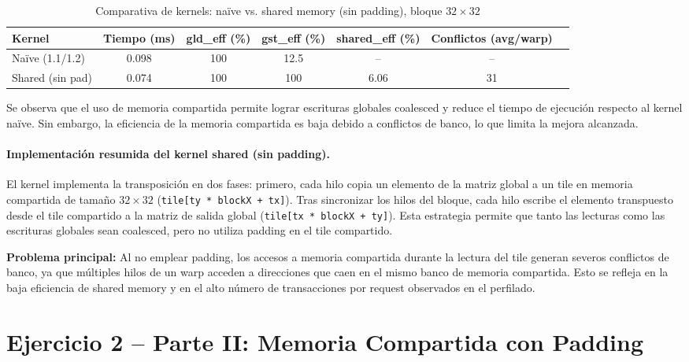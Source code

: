 \documentclass[a4paper,11pt]{article}
\begin{document}
\begin{table}[H]
\centering
\caption{Comparativa de kernels: naïve vs. shared memory (sin padding), bloque $32\times32$}
\begin{tabular}{lcccccc}
\toprule
Kernel & Tiempo (ms) & gld\_eff (\%) & gst\_eff (\%) & shared\_eff (\%) & Conflictos (avg/warp) \\
\midrule
Naïve (1.1/1.2) & 0.098 & 100 & 12.5 & -- & -- \\
Shared (sin pad) & 0.074 & 100 & 100 & 6.06 & 31 \\
\bottomrule
\end{tabular}
\end{table}

Se observa que el uso de memoria compartida permite lograr escrituras globales coalesced y reduce el tiempo de ejecución respecto al kernel naïve. Sin embargo, la eficiencia de la memoria compartida es baja debido a conflictos de banco, lo que limita la mejora alcanzada.


\paragraph{Implementación resumida del kernel shared (sin padding).}
El kernel implementa la transposición en dos fases: primero, cada hilo copia un elemento de la matriz global a un tile en memoria compartida de tamaño $32\times32$ (\texttt{tile[ty * blockX + tx]}). Tras sincronizar los hilos del bloque, cada hilo escribe el elemento transpuesto desde el tile compartido a la matriz de salida global (\texttt{tile[tx * blockX + ty]}). Esta estrategia permite que tanto las lecturas como las escrituras globales sean coalesced, pero no utiliza padding en el tile compartido.

\textbf{Problema principal:} Al no emplear padding, los accesos a memoria compartida durante la lectura del tile generan severos conflictos de banco, ya que múltiples hilos de un warp acceden a direcciones que caen en el mismo banco de memoria compartida. Esto se refleja en la baja eficiencia de shared memory y en el alto número de transacciones por request observados en el perfilado.

\section{Ejercicio 2 – Parte II: Memoria Compartida con Padding}
\end{document}
